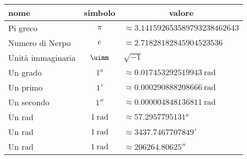 {\centering	{}\label{Tab:CostantiNumeriche}
\begin{tabular}{lcl}
	\toprule
	nome&simbolo&\multicolumn{1}{c}{valore}\\
	\midrule
Pi greco &$\pi$&$\approx\num{3.141592653589793238462643}$	\\ 
Numero di Nerpo &$e$&$\approx\num{2.71828182845904523536}$	\\ 
Unità immaginaria&$\uimm$&$\sqrt{-1}$\\
Un grado &$\ang{1;;}$&$\approx\SI{0.017453292519943}{\radian}$\\
Un primo &$\ang{;1;}$&$\approx\SI{0.000290888208666}{\radian}$\\
Un secondo &$\ang{;;1}$&$\approx\SI{0.000004848136811}{\radian}$\\
Un rad&$\SI{1}{\radian}$&$\approx\ang{57.2957795131;;}$\\
Un rad&$\SI{1}{\radian}$&$\approx\ang{;3437,7467707849;}$\\
Un rad&$\SI{1}{\radian}$&$\approx\ang{;;206264,80625}$\\
\bottomrule
\end{tabular}\par}
\newpage

